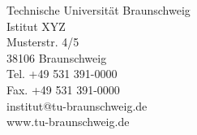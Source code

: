\documentclass[
notumble,%
langpaper]{tubsleaflet}
\begin{document}
\begin{gausspage}
  \begin{segment}[bgcolor=tubsBlue60]{4}
    \mdseries
    Technische Universität Braunschweig\\
    Istitut XYZ\\
    Musterstr. 4/5\\
    38106 Braunschweig\\
    Tel. +49 531 391-0000\\
    Fax. +49 531 391-0000\\
    institut@tu-braunschweig.de\\
    www.tu-braunschweig.de
  \end{segment}
  \begin{segment}[bgcolor=tubsBlue]{4}
  \end{segment}
\end{gausspage}
\end{document}
